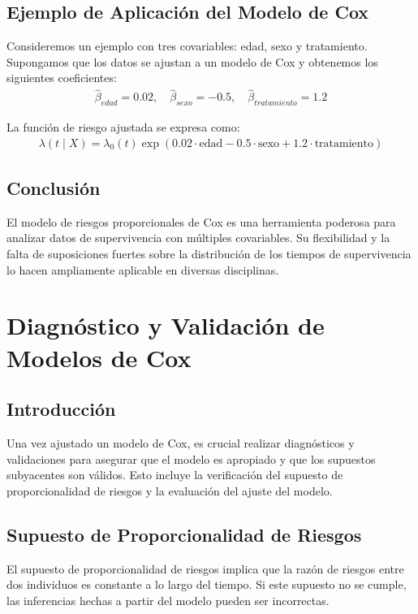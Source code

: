 \documentclass[a4paper]{report} %
\begin{document}
\section{Ejemplo de Aplicaci\'on del Modelo de Cox}
Consideremos un ejemplo con tres covariables: edad, sexo y tratamiento. Supongamos que los datos se ajustan a un modelo de Cox y obtenemos los siguientes coeficientes:
\begin{eqnarray*}
\hat{\beta}_{edad} = 0.02, \quad \hat{\beta}_{sexo} = -0.5, \quad \hat{\beta}_{tratamiento} = 1.2
\end{eqnarray*}

La funci\'on de riesgo ajustada se expresa como:
\begin{eqnarray*}
\lambda(t \mid X) = \lambda_0(t) \exp(0.02 \cdot \text{edad} - 0.5 \cdot \text{sexo} + 1.2 \cdot \text{tratamiento})
\end{eqnarray*}

\section{Conclusi\'on}
El modelo de riesgos proporcionales de Cox es una herramienta poderosa para analizar datos de supervivencia con m\'ultiples covariables. Su flexibilidad y la falta de suposiciones fuertes sobre la distribuci\'on de los tiempos de supervivencia lo hacen ampliamente aplicable en diversas disciplinas.


\chapter{Diagn\'ostico y Validaci\'on de Modelos de Cox}
\section{Introducci\'on}
Una vez ajustado un modelo de Cox, es crucial realizar diagn\'osticos y validaciones para asegurar que el modelo es apropiado y que los supuestos subyacentes son v\'alidos. Esto incluye la verificaci\'on del supuesto de proporcionalidad de riesgos y la evaluaci\'on del ajuste del modelo.

\section{Supuesto de Proporcionalidad de Riesgos}
El supuesto de proporcionalidad de riesgos implica que la raz\'on de riesgos entre dos individuos es constante a lo largo del tiempo. Si este supuesto no se cumple, las inferencias hechas a partir del modelo pueden ser incorrectas.
\end{document}
